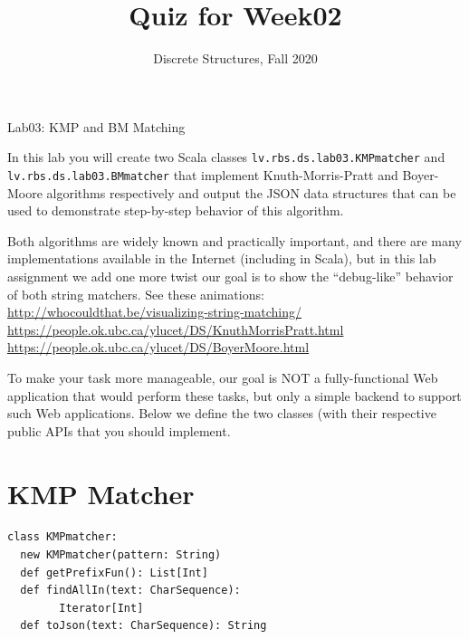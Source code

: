 \documentclass[jou]{apa6}
\title{Quiz for Week02}
\author{Discrete Structures, Fall 2020}
\affiliation{RBS}
\begin{document}

\twocolumn
{\Large Lab03: KMP and BM Matching}

\thispagestyle{empty}

In this lab you will create two Scala classes {\tt lv.rbs.ds.lab03.KMPmatcher}
and {\tt lv.rbs.ds.lab03.BMmatcher} that implement Knuth-Morris-Pratt and 
Boyer-Moore algorithms respectively and output the JSON data structures
that can be used to demonstrate step-by-step behavior of this algorithm. 

Both algorithms are widely known and practically important, and there are many implementations available
in the Internet (including in Scala), but in this lab assignment we add 
one more twist \textendash{} our goal is to show the ``debug-like'' behavior of 
both string matchers. See these animations:\\
\url{http://whocouldthat.be/visualizing-string-matching/}\\
\url{https://people.ok.ubc.ca/ylucet/DS/KnuthMorrisPratt.html}\\
\url{https://people.ok.ubc.ca/ylucet/DS/BoyerMoore.html}

To make your task more manageable, our goal is NOT a fully-functional Web application
that would perform these tasks, but only a simple backend to support such Web applications. 
Below we define the two classes (with their respective public APIs that you should implement.

\section{KMP Matcher}

\begin{verbatim}
class KMPmatcher:
  new KMPmatcher(pattern: String)
  def getPrefixFun(): List[Int]
  def findAllIn(text: CharSequence): 
        Iterator[Int]
  def toJson(text: CharSequence): String
\end{verbatim}
\end{document}
